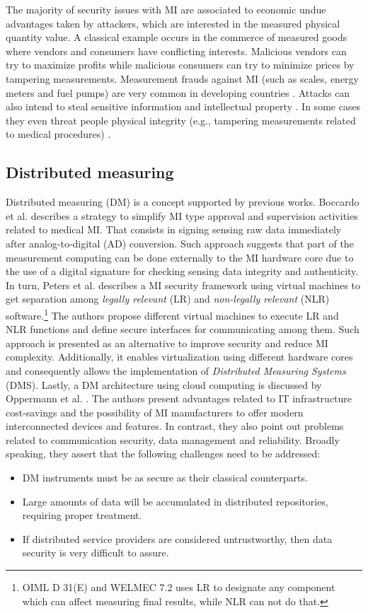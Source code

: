 \documentclass[journal]{IEEEtran}
\begin{document}
The majority of security issues with MI are associated to economic undue advantages taken by attackers, which are interested in the measured physical quantity value. A classical example occurs in the commerce of measured goods where vendors and consumers have conflicting interests\cite{RodriguesFilho2015}. Malicious vendors can try to maximize profits while malicious consumers can try to minimize prices by tampering measurements. Measurement frauds against MI (such as scales, energy meters and fuel pumps) are very common in developing countries \cite{Camara2012,Luchsinger2008}. Attacks can also intend to steal sensitive information and intellectual property \cite{Camara2012,Oppermann2016}. In some cases they even threat people physical integrity (e.g., tampering measurements related to medical procedures) \cite{Boccardo2014}.

\subsection{Distributed measuring}
Distributed measuring (DM) is a concept supported by previous works. Boccardo et al. \cite{Boccardo2014} describes a strategy to simplify MI type approval and supervision activities related to medical MI. That consists in signing sensing raw data immediately after analog-to-digital (AD) conversion. Such approach suggests that part of the measurement computing can be done externally to the MI hardware core due to the use of a digital signature for checking sensing data integrity and authenticity. In turn, Peters et al. \cite{Peters2015} describes a MI security framework using virtual machines to get separation among \emph{legally relevant} (LR) and \emph{non-legally relevant} (NLR) software.\footnote{OIML D 31(E) and WELMEC 7.2 uses LR to designate any component which can affect measuring final results, while NLR can not do that.} The authors propose different virtual machines to execute LR and NLR functions and define secure interfaces for communicating among them. Such approach is presented as an alternative to improve security and reduce MI complexity. Additionally, it enables virtualization using different hardware cores and consequently allows the implementation of \emph{Distributed Measuring Systems} (DMS). Lastly, a DM architecture using cloud computing is discussed by Oppermann et al. \cite{Oppermann2016}. The authors present advantages related to IT infrastructure cost-savings and the possibility of MI manufacturers to offer modern interconnected devices and features. In contrast, they also point out problems related to communication security, data management and reliability. Broadly speaking, they assert that the following challenges need to be addressed:
\begin{itemize}
 \item DM instruments must be as secure as their classical counterparts.
 \item Large amounts of data will be accumulated in distributed repositories, requiring proper treatment.
 \item If distributed service providers are considered untrustworthy, then data security is very difficult to assure. 
\end{itemize}
\end{document}
